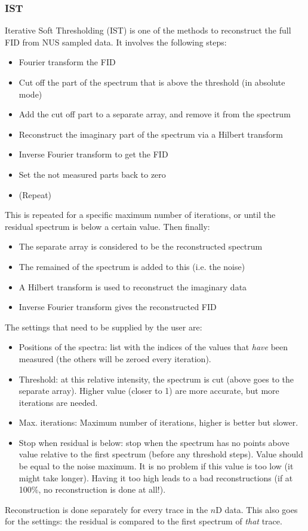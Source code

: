 \documentclass[11pt,a4paper]{article}
\begin{document}
\subsubsection{IST}
Iterative Soft Thresholding (IST) is one of the methods to reconstruct the full FID from NUS sampled data. It involves the following steps:
\begin{itemize}
  \item Fourier transform the FID
  \item Cut off the part of the spectrum that is above the threshold (in absolute mode)
  \item Add the cut off part to a separate array, and remove it from the spectrum
  \item Reconstruct the imaginary part of the spectrum via a Hilbert transform
  \item Inverse Fourier transform to get the FID
  \item Set the not measured parts back to zero
\item (Repeat)
\end{itemize}
This is repeated for a specific maximum number of iterations, or until the residual spectrum is below a certain value.
Then finally:
\begin{itemize}
  \item The separate array is considered to be the reconstructed spectrum
  \item The remained of the spectrum is added to this (i.e. the noise)
  \item A Hilbert transform is used to reconstruct the imaginary data
  \item Inverse Fourier transform gives the reconstructed FID
\end{itemize}
The settings that need to be supplied by the user are:
\begin{itemize}
  \item Positions of the spectra: list with the indices of the values that \textit{have} been measured (the others will be zeroed every iteration).
  \item Threshold: at this relative intensity, the spectrum is cut (above goes to the separate array). Higher value (closer to 1) are more accurate, but more iterations are needed.
  \item Max. iterations: Maximum number of iterations, higher is better but slower.
  \item Stop when residual is below: stop when the spectrum has no points above value relative to the first spectrum (before any threshold steps). Value should be equal to the noise maximum.
	 It is no problem if this value is too low (it might take longer). Having it too high leads to a bad reconstructions (if at 100\%, no reconstruction is done at all!).
\end{itemize}
Reconstruction is done separately for every trace in the $n$D data. This also goes for the settings: the residual is compared to the first spectrum of \textit{that} trace.
\end{document}
